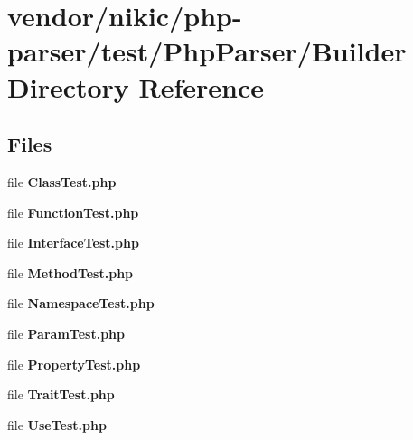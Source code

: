 \section{vendor/nikic/php-\/parser/test/\+Php\+Parser/\+Builder Directory Reference}
\label{dir_267c0f0ae49948a3fd91f444aa563788}
\subsection*{Files}
\begin{DoxyCompactItemize}
\item 
file {\bf Class\+Test.\+php}
\item 
file {\bf Function\+Test.\+php}
\item 
file {\bf Interface\+Test.\+php}
\item 
file {\bf Method\+Test.\+php}
\item 
file {\bf Namespace\+Test.\+php}
\item 
file {\bf Param\+Test.\+php}
\item 
file {\bf Property\+Test.\+php}
\item 
file {\bf Trait\+Test.\+php}
\item 
file {\bf Use\+Test.\+php}
\end{DoxyCompactItemize}
